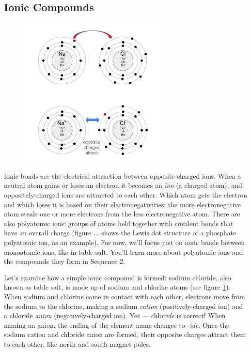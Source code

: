 \subsection{Ionic Compounds}
\begin{figure}
\noindent\includegraphics[width=3in]{NaCl_xfer.png}
\caption{}
\label{fig:NaCl_xfer}
\end{figure}
Ionic bonds are the electrical attraction between opposite-charged ions. When a 
neutral atom gains or loses an electron it becomes an \textit{ion} (a charged 
atom), and oppositely-charged ions are attracted to each other. Which atom gets 
the electron and which loses it is based on their electronegativities: the more 
electronegative atom steals one or more electrons from the less electronegative 
atom. There are also polyatomic ions: groups of atoms held together with covalent 
bonds that have an overall charge (figure ... shows the Lewis dot structure of a phosphate polyatomic ion, as an example). For now, we'll focus just on 
ionic bonds between monoatomic ions, like in table salt. You'll learn more about 
polyatomic ions and the compounds they form in Sequence 2. 

Let's examine how a simple ionic compound is formed: sodium chloride, also known 
as table salt, is made up of sodium and chlorine atoms (see figure 
\ref{fig:NaCl_xfer}). When sodium and chlorine come in contact with each other, 
electrons move from the sodium to the chlorine, making a sodium \textit{cation} 
(positively-charged ion) and a chloride \textit{anion} (negatively-charged ion). 
Yes --- chlor\textit{ide} is correct! When naming an anion, the ending of the 
element name changes to \textit{-ide}. Once the sodium cation and chloride anion 
are formed, their opposite charges attract them to each other, like north and 
south magnet poles. 

